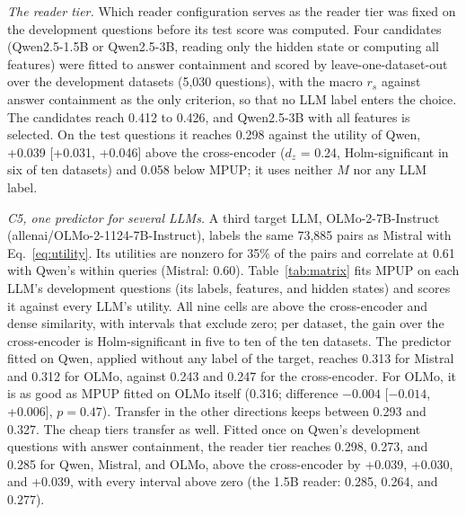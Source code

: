 \documentclass[conference]{IEEEtran}
\begin{document}
\textit{The reader tier.} Which reader configuration serves as the reader tier was fixed on the development questions before its test score was computed. Four candidates (Qwen2.5-1.5B or Qwen2.5-3B, reading only the hidden state or computing all features) were fitted to answer containment and scored by leave-one-dataset-out over the development datasets (5,030 questions), with the macro $r_s$ against answer containment as the only criterion, so that no LLM label enters the choice. The candidates reach 0.412 to 0.426, and Qwen2.5-3B with all features is selected. On the test questions it reaches 0.298 against the utility of Qwen, +0.039 [+0.031, +0.046] above the cross-encoder ($d_z$ = 0.24, Holm-significant in six of ten datasets) and 0.058 below MPUP; it uses neither $M$ nor any LLM label.

\textit{C5, one predictor for several LLMs.} A third target LLM, OLMo-2-7B-Instruct (allenai/OLMo-2-1124-7B-Instruct), labels the same 73,885 pairs as Mistral with Eq.~\eqref{eq:utility}. Its utilities are nonzero for 35\% of the pairs and correlate at 0.61 with Qwen's within queries (Mistral: 0.60). Table~\ref{tab:matrix} fits MPUP on each LLM's development questions (its labels, features, and hidden states) and scores it against every LLM's utility. All nine cells are above the cross-encoder and dense similarity, with intervals that exclude zero; per dataset, the gain over the cross-encoder is Holm-significant in five to ten of the ten datasets. The predictor fitted on Qwen, applied without any label of the target, reaches 0.313 for Mistral and 0.312 for OLMo, against 0.243 and 0.247 for the cross-encoder. For OLMo, it is as good as MPUP fitted on OLMo itself (0.316; difference $-0.004$ [$-0.014$, +0.006], $p = 0.47$). Transfer in the other directions keeps between 0.293 and 0.327. The cheap tiers transfer as well. Fitted once on Qwen's development questions with answer containment, the reader tier reaches 0.298, 0.273, and 0.285 for Qwen, Mistral, and OLMo, above the cross-encoder by +0.039, +0.030, and +0.039, with every interval above zero (the 1.5B reader: 0.285, 0.264, and 0.277).
\end{document}
